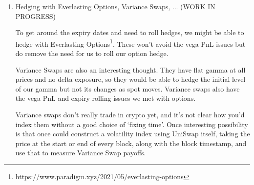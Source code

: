 \documentclass{article}
\begin{document}
\begin{enumerate}
\item Hedging with Everlasting Options, Variance Swaps, ... (WORK IN PROGRESS)

To get around the expiry dates and need to roll hedges, we might be able to hedge with Everlasting Options\footnote{https://www.paradigm.xyz/2021/05/everlasting-options}. These won't avoid the vega PnL issues but do remove the need for us to roll our option hedge.

Variance Swaps are also an interesting thought. They have flat gamma at all prices and no delta exposure, so they would be able to hedge the initial level of our gamma but not its changes as spot moves. Variance swaps also have the vega PnL and expiry rolling issues we met with options.

Variance swaps don't really trade in crypto yet, and it's not clear how you'd index them without a good choice of `fixing time'. Once interesting possibility is that once could construct a volatility index using UniSwap itself, taking the price at the start or end of every block, along with the block timestamp, and use that to measure Variance Swap payoffs.

\end{enumerate}
\end{document}

